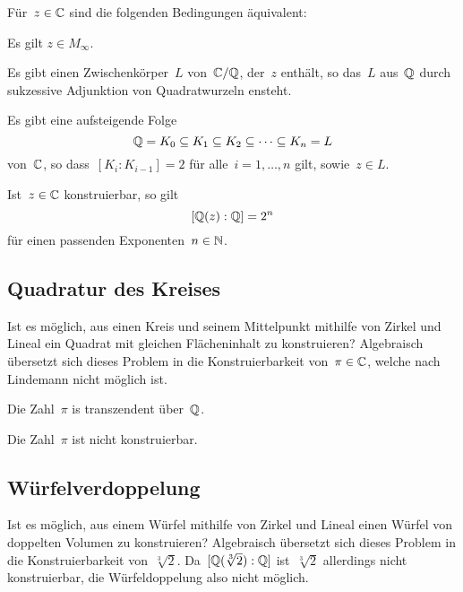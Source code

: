 \begin{theorem}
  Für~$z \in \mathbb{C}$ sind die folgenden Bedingungen äquivalent:
  \begin{equivlist}
    \item
      Es gilt $z \in M_{\infty}$.
    \item
      Es gibt einen Zwischenkörper~$L$ von~$\mathbb{C}/\mathbb{Q}$, der~$z$ enthält, so das~$L$ aus~$\mathbb{Q}$ durch sukzessive Adjunktion von Quadratwurzeln ensteht.
    \item
      Es gibt eine aufsteigende Folge
      \[
        \mathbb{Q} = K_0 \subseteq K_1 \subseteq K_2 \subseteq \dotsb \subseteq K_n = L
      \]
      von~$\mathbb{C}$, so dass~$[K_i : K_{i-1}] = 2$ für alle~$i = 1, \dotsc, n$ gilt, sowie~$z \in L$.
  \end{equivlist}
\end{theorem}

\begin{corollary}
  Ist~$z \in \mathbb{C}$ konstruierbar, so gilt
  \[
    [\mathbb{Q}(z) : \mathbb{Q}] = 2^n
  \] 
  für einen passenden Exponenten~$n \in \mathbb{N}$.
\end{corollary}



\subsection{Quadratur des Kreises}

Ist es möglich, aus einen Kreis und seinem Mittelpunkt mithilfe von Zirkel und Lineal ein Quadrat mit gleichen Flächeninhalt zu konstruieren?
Algebraisch übersetzt sich dieses Problem in die Konstruierbarkeit von~$\pi \in \mathbb{C}$, welche nach Lindemann nicht möglich ist.

\begin{theorem}[Lindemann]
  Die Zahl~$\pi$ is transzendent über~$\mathbb{Q}$.
\end{theorem}

\begin{corollary}
  Die Zahl~$\pi$ ist nicht konstruierbar.
\end{corollary}



\subsection{Würfelverdoppelung}

Ist es möglich, aus einem Würfel mithilfe von Zirkel und Lineal einen Würfel von doppelten Volumen zu konstruieren?
Algebraisch übersetzt sich dieses Problem in die Konstruierbarkeit von~$\sqrt[3]{2}$.
Da~$[\mathbb{Q}( \sqrt[3]{2} ) : \mathbb{Q}]$ ist~$\sqrt[3]{2}$ allerdings nicht konstruierbar, die Würfeldoppelung also nicht möglich.



